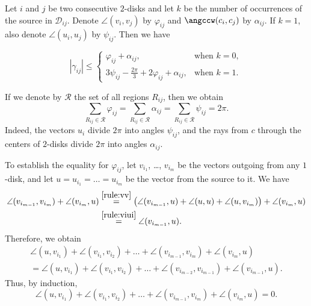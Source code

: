 \begin{claim}
\label{lemma:can-construct}

Let $i$ and $j$ be two consecutive $2$-disks and let $k$ be the number of occurrences of the source in $\mathcal{D}_{ij}$. Denote $\angle(v_i, v_j)$ by $\varphi_{ij}$ and $\angccw(c_i, c_j)$ by $\alpha_{ij}$. If $k = 1$, also denote $\angle(u_i, u_j)$ by $\psi_{ij}$. Then we have

\begin{equation*}
\label{eq:curve_bound}
|\gamma_{ij}|\leq\begin{cases}
\displaystyle
\varphi_{ij} + \alpha_{ij}, & \text{when }k = 0, \\
3\psi_{ij} - \frac{2\pi}{3} + 2\varphi_{ij} + \alpha_{ij}, & \text{when }k = 1.
\end{cases}%
\end{equation*}
\end{claim}


If we denote by $\mathcal{R}$ the set of all regions $R_{ij}$, then we obtain \begin{equation}\sum_{R_{ij}\in\mathcal{R}}\varphi_{ij} = \sum_{R_{ij}\in\mathcal{R}}\alpha_{ij} = \sum_{R_{ij}\in\mathcal{R}}\psi_{ij} = 2\pi.\label{eqn:sums-of-angles-are-2pi}
\end{equation}
Indeed, the vectors $u_i$ divide $2\pi$ into angles $\psi_{ij}$, and the rays from $c$ through the centers of $2$-disks divide $2\pi$ into angles $\alpha_{ij}$.

To establish the equality for $\varphi_{ij}$, let $v_{i_1}$, \ldots, $v_{i_m}$ be the vectors outgoing from any $1$-disk, and let $u = u_{i_1} = \ldots = u_{i_m}$ be the vector from the source to it.
We have
\begin{align*}
\angle(v_{i_{m-1}}, v_{i_m}) + \angle(v_{i_m}, u) & \stackrel{\ref{rule:vv}}{=} \big(\angle(v_{i_{m-1}}, u) + \angle(u, u) + \angle(u, v_{i_m})\big) + \angle(v_{i_m}, u) \\ & \stackrel{\ref{rule:viui}}{=} \angle(v_{i_{m-1}}, u).
\end{align*}
Therefore, we obtain
\begin{multline*}
\angle(u, v_{i_1}) + \angle(v_{i_1}, v_{i_2}) + \ldots + \angle(v_{i_{m-1}}, v_{i_m}) + \angle(v_{i_m}, u) \\
= \angle(u, v_{i_1}) + \angle(v_{i_1}, v_{i_2}) + \ldots + \angle(v_{i_{m-2}}, v_{i_{m-1}}) + \angle(v_{i_{m-1}}, u).
\end{multline*}
Thus, by induction,
$$\angle(u, v_{i_1}) + \angle(v_{i_1}, v_{i_2}) + \ldots + \angle(v_{i_{m-1}}, v_{i_m}) + \angle(v_{i_m}, u) = 0.$$

